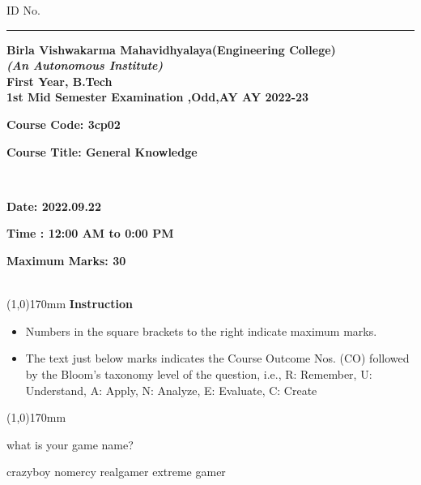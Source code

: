 \documentclass[addpoints,12pt]{exam}
\begin{document}
    \hspace{-7mm}ID No.\rule{20mm}{0.3mm}
    \begin{center}
 \textbf{Birla Vishwakarma Mahavidhyalaya(Engineering College)} \\
  \textbf{\textit{(An Autonomous Institute)}} \\
  \textbf{First Year, B.Tech} \\
  \textbf{1st Mid Semester Examination ,Odd,AY AY 2022-23} \\
  \vspace{4mm}
 
 
  \end{center}
 
  \hspace{-7mm}
  \parbox[t]{50mm}{\textbf{Course Code: 3cp02}}
  \parbox[t]{100mm}{\textbf{Course Title: General Knowledge}}\vspace{2mm}\\
  \parbox[t]{50mm}{\textbf{Date: 2022.09.22}}
  \parbox[t]{75mm}{\textbf{Time : 12:00 AM to 0:00 PM}}
  \parbox[t]{50mm}{\textbf{Maximum Marks: 30}}\\
  \line(1,0){170mm} \vspace{2mm}
  \hspace{-6mm}\textbf{Instruction}

 

  \begin{itemize}[leftmargin=4mm,rightmargin=-2cm]
      \item Numbers in the square brackets to the right indicate maximum marks.
     
      \item The text just below marks indicates the Course Outcome Nos. (CO) followed by the Bloom’s taxonomy level of the question, i.e., R: Remember, U: Understand, A: Apply, N: Analyze, E: Evaluate, C: Create
  \end{itemize}
  \line(1,0){170mm}
 \vspace{5mm}
\begin{questions}
\pointname{}
\pointsinrightmargin
\pointformat{\parbox[t]{16pt}{\text{[\thepoints]}}}
\question[5]
\vspace{1.5mm}what is your game name?

\vspace{1.5mm}
\begin{oneparchoices}
\choice crazyboy
\choice nomercy
\choice realgamer
\choice extreme gamer
\end{oneparchoices}
\vspace{1.5mm}
\end{questions}
\end{document}

